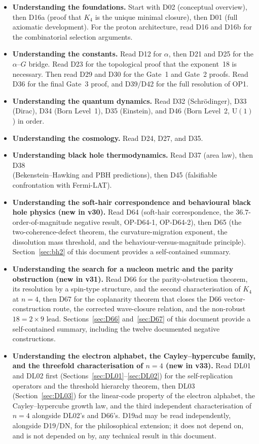 \documentclass[11pt,a4paper]{article}
\theoremstyle{plain}
\theoremstyle{definition}
\theoremstyle{remark}
\begin{document}
\begin{itemize}
\item \textbf{Understanding the foundations.} Start with D02 (conceptual overview), then D16a (proof that $K_4$ is the unique minimal closure), then D01 (full axiomatic development). For the proton architecture, read D16 and D16b for the combinatorial selection arguments.
\item \textbf{Understanding the constants.} Read D12 for $\alpha$, then D21 and D25 for the $\alpha$--$G$ bridge. Read D23 for the topological proof that the exponent~18 is necessary. Then read D29 and D30 for the Gate~1 and Gate~2 proofs. Read D36 for the final Gate~3 proof, and D39/D42 for the full resolution of OP1.
\item \textbf{Understanding the quantum dynamics.} Read D32 (Schr\"odinger), D33 (Dirac), D34 (Born Level~1), D35 (Einstein), and D46 (Born Level~2, $\mathrm{U}(1)$) in order.
\item \textbf{Understanding the cosmology.} Read D24, D27, and D35.
\item \textbf{Understanding black hole thermodynamics.} Read D37 (area law), then D38 \\ (Bekenstein--Hawking and PBH predictions), then D45 (falsifiable confrontation with Fermi-LAT).
\item \textbf{Understanding the soft-hair correspondence and behavioural black hole physics (new in v30).} Read D64 (soft-hair correspondence, the $36.7$-order-of-magnitude negative result, OP-D64-1, OP-D64-2), then D65 (the two-coherence-defect theorem, the curvature-migration exponent, the dissolution mass threshold, and the behaviour-versus-magnitude principle). Section~\ref{sec:bh2} of this document provides a self-contained summary.
\item \textbf{Understanding the search for a nucleon metric and the parity obstruction (new in v31).} Read D66 for the parity-obstruction theorem, its resolution by a spin-type structure, and the second characterisation of $K_4$ at $n=4$, then D67 for the coplanarity theorem that closes the D66 vector-construction route, the corrected wave-closure relation, and the non-robust $18=2\times9$ lead. Sections~\ref{sec:D66} and~\ref{sec:D67} of this document provide a self-contained summary, including the twelve documented negative constructions.
\item \textbf{Understanding the electron alphabet, the Cayley--hypercube family, and the threefold characterisation of $n=4$ (new in v33).} Read DL01 and DL02 first (Sections~\ref{sec:DL01}--\ref{sec:DL02}) for the self-replication operators and the threshold hierarchy theorem, then DL03 (Section~\ref{sec:DL03}) for the linear-code property of the electron alphabet, the Cayley--hypercube growth law, and the third independent characterisation of $n=4$ alongside DL02's and D66's. D19ad may be read independently, alongside D19/DN, for the philosophical extension; it does not depend on, and is not depended on by, any technical result in this document.

\end{itemize}
\end{document}
